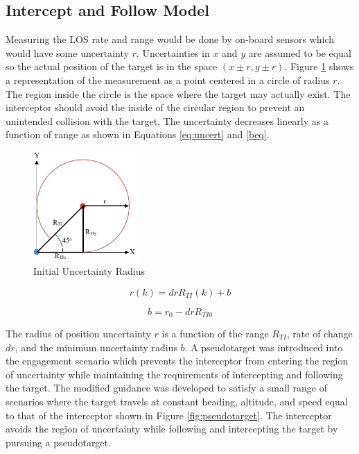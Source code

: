 \documentclass[conference]{IEEEtran}
\begin{document}
\subsection{Intercept and Follow Model}
Measuring the LOS rate and range would be done by on-board sensors which would have some uncertainty $r$. Uncertainties in $x$ and $y$ are assumed to be equal so the actual position of the target is in the space $(x\pm r,y \pm r)$. Figure \ref{fig:uncertrad} shows a representation of the measurement as a point centered in a circle of radius $r$. The region inside the circle is the space where the target may actually exist. The interceptor should avoid the inside of the circular region to prevent an unintended collision with the target. The uncertainty decreases linearly as a function of range as shown in Equations \ref{eq:uncert} and \ref{beq}.

\begin{figure}[H]
	\centering
	\includegraphics[width=4cm]{45deguncert.PNG}
	\caption{Initial Uncertainty Radius}
	\label{fig:uncertrad}
\end{figure}

\begin{equation} \label{eq:uncert}
r(k) = drR_{TI}(k)+b
\end{equation}

\begin{equation} \label{beq}
b = r_0-drR_{TI0}
\end{equation}

The radius of position uncertainty $r$ is a function of the range $R_{TI}$, rate of change $dr$, and the minimum uncertainty radius $b$. A pseudotarget was introduced into the engagement scenario which prevents the interceptor from entering the region of uncertainty while maintaining the requirements of intercepting and following the target. The modified guidance was developed to satisfy a small range of scenarios where the target travels at constant heading, altitude, and speed equal to that of the interceptor shown in Figure \ref{fig:pseudotarget}. The interceptor avoids the region of uncertainty while following and intercepting the target by pursuing a pseudotarget. 
\end{document}
